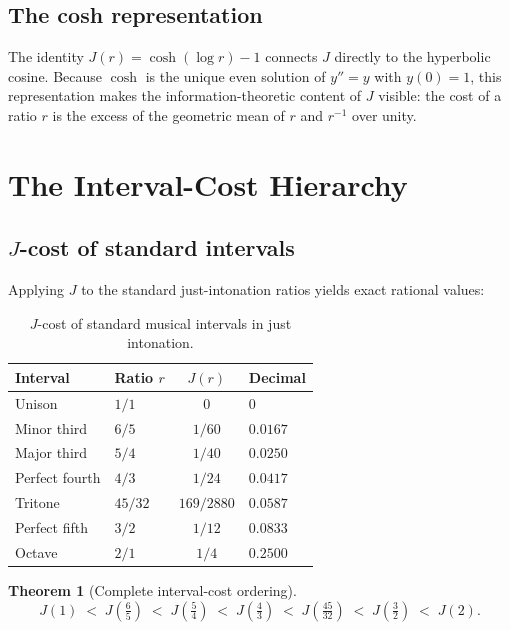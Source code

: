\documentclass[11pt,a4paper]{article}
\newtheorem{theorem}{Theorem}
\begin{document}
\subsection{The cosh representation}

The identity $J(r)=\cosh(\log r)-1$ connects $J$ directly to the
hyperbolic cosine.  Because $\cosh$ is the unique even solution of
$y''=y$ with $y(0)=1$, this representation makes the
information-theoretic content of $J$ visible: the cost of a ratio $r$
is the excess of the geometric mean of $r$ and $r^{-1}$ over unity.

\section{The Interval-Cost Hierarchy}
\label{sec:hierarchy}

\subsection{\texorpdfstring{$J$-cost}{J-cost} of standard intervals}

Applying $J$ to the standard just-intonation ratios yields exact
rational values:

\begin{table}[H]
\centering
\caption{$J$-cost of standard musical intervals in just intonation.}
\label{tab:jcost}
\begin{tabular}{@{}llcl@{}}
\toprule
Interval & Ratio $r$ & $J(r)$ & Decimal \\
\midrule
Unison        & $1/1$    & $0$          & $0$ \\
Minor third   & $6/5$    & $1/60$       & $0.0167$ \\
Major third   & $5/4$    & $1/40$       & $0.0250$ \\
Perfect fourth& $4/3$    & $1/24$       & $0.0417$ \\
Tritone       & $45/32$  & $169/2880$   & $0.0587$ \\
Perfect fifth & $3/2$    & $1/12$       & $0.0833$ \\
Octave        & $2/1$    & $1/4$        & $0.2500$ \\
\bottomrule
\end{tabular}
\end{table}

\begin{theorem}[Complete interval-cost ordering]
\label{thm:hierarchy}
\[
  J(1) \;<\; J\!\left(\tfrac{6}{5}\right)
       \;<\; J\!\left(\tfrac{5}{4}\right)
       \;<\; J\!\left(\tfrac{4}{3}\right)
       \;<\; J\!\left(\tfrac{45}{32}\right)
       \;<\; J\!\left(\tfrac{3}{2}\right)
       \;<\; J(2).
\]
\end{theorem}
\end{document}
